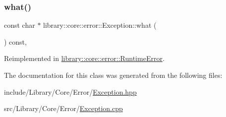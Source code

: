 \mbox{\label{classlibrary_1_1core_1_1error_1_1_exception_ab318a927162519b15961ca66be07fd6b}} 
\subsubsection{\texorpdfstring{what()}{what()}}
{\footnotesize\ttfamily const char $\ast$ library\+::core\+::error\+::\+Exception\+::what (\begin{DoxyParamCaption}{ }\end{DoxyParamCaption}) const\hspace{0.3cm}{\ttfamily [virtual]}, {\ttfamily [noexcept]}}



Reimplemented in \hyperlink{classlibrary_1_1core_1_1error_1_1_runtime_error_af3da31cf67f3f5e120c5db9072e3a801}{library\+::core\+::error\+::\+Runtime\+Error}.



The documentation for this class was generated from the following files\+:\begin{DoxyCompactItemize}
\item 
include/\+Library/\+Core/\+Error/\hyperlink{_exception_8hpp}{Exception.\+hpp}\item 
src/\+Library/\+Core/\+Error/\hyperlink{_exception_8cpp}{Exception.\+cpp}\end{DoxyCompactItemize}
